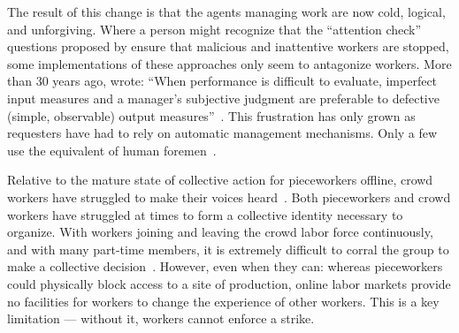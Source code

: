 \documentclass[trackingWork]{subfiles}
\begin{document}

The result of this change is that the agents managing work are now
cold, logical, and unforgiving.
Where a person might recognize that the ``attention check'' questions 
proposed by \citeauthor{le2010ensuring} ensure that malicious and inattentive workers are stopped,
some implementations of these approaches
only seem to antagonize workers.
More than 30 years ago, \citeauthor{10.2307/2555446} wrote:
``When performance is difficult to evaluate,
imperfect input measures and
a manager's subjective judgment are preferable to
defective (simple, observable) output measures''~\cite{10.2307/2555446}.
This frustration has only grown as requesters have had to rely on automatic management mechanisms. Only a few use the equivalent of human foremen~\cite{haas2015argonaut,kulkarni2012mobileworks}.


Relative to the mature state of collective action for pieceworkers offline, crowd workers have struggled to make their voices heard~\cite{dynamo,storiesIraniSilberman,turkopticon}.
Both pieceworkers and crowd workers have struggled at times to form a collective identity necessary to organize.
With workers joining and leaving the crowd labor force continuously, and with many part-time members, it is extremely difficult to corral the group to make a collective decision~\cite{dynamo}.
However, even when they can: whereas pieceworkers could physically block access to a site of production, online labor markets provide no facilities for workers to change the experience of other workers.
This is a key limitation --- without it, workers cannot enforce a strike.
\end{document}
